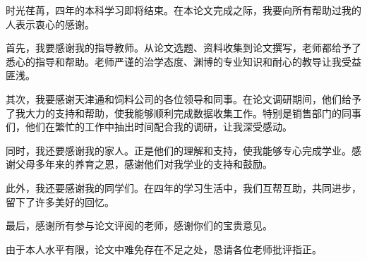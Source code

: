 
\begin{acknowledgement}

时光荏苒，四年的本科学习即将结束。在本论文完成之际，我要向所有帮助过我的人表示衷心的感谢。

首先，我要感谢我的指导教师。从论文选题、资料收集到论文撰写，老师都给予了悉心的指导和帮助。老师严谨的治学态度、渊博的专业知识和耐心的教导让我受益匪浅。

其次，我要感谢天津通和饲料公司的各位领导和同事。在论文调研期间，他们给予了我大力的支持和帮助，使我能够顺利完成数据收集工作。特别是销售部门的同事们，他们在繁忙的工作中抽出时间配合我的调研，让我深受感动。

同时，我还要感谢我的家人。正是他们的理解和支持，使我能够专心完成学业。感谢父母多年来的养育之恩，感谢他们对我学业的支持和鼓励。

此外，我还要感谢我的同学们。在四年的学习生活中，我们互帮互助，共同进步，留下了许多美好的回忆。

最后，感谢所有参与论文评阅的老师，感谢你们的宝贵意见。

由于本人水平有限，论文中难免存在不足之处，恳请各位老师批评指正。

\end{acknowledgement}
